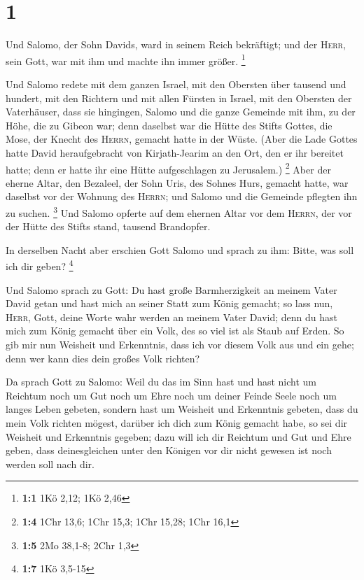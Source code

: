 \hypertarget{section}{%
\section{1}\label{section}}

 Und Salomo, der Sohn Davids, ward in seinem Reich
bekräftigt; und der \textsc{Herr}, sein Gott, war mit ihm und machte ihn
immer größer. \footnote{\textbf{1:1} 1Kö 2,12; 1Kö 2,46}

 Und Salomo redete mit dem ganzen Israel, mit den Obersten
über tausend und hundert, mit den Richtern und mit allen Fürsten in
Israel, mit den Obersten der Vaterhäuser,  dass sie
hingingen, Salomo und die ganze Gemeinde mit ihm, zu der Höhe, die zu
Gibeon war; denn daselbst war die Hütte des Stifts Gottes, die Mose, der
Knecht des \textsc{Herrn}, gemacht hatte in der Wüste. 
(Aber die Lade Gottes hatte David heraufgebracht von Kirjath-Jearim an
den Ort, den er ihr bereitet hatte; denn er hatte ihr eine Hütte
aufgeschlagen zu Jerusalem.) \footnote{\textbf{1:4} 1Chr 13,6; 1Chr
  15,3; 1Chr 15,28; 1Chr 16,1}  Aber der eherne Altar, den
Bezaleel, der Sohn Uris, des Sohnes Hurs, gemacht hatte, war daselbst
vor der Wohnung des \textsc{Herrn}; und Salomo und die Gemeinde pflegten
ihn zu suchen. \footnote{\textbf{1:5} 2Mo 38,1-8; 2Chr 1,3}
 Und Salomo opferte auf dem ehernen Altar vor dem
\textsc{Herrn}, der vor der Hütte des Stifts stand, tausend Brandopfer.

 In derselben Nacht aber erschien Gott Salomo und sprach
zu ihm: Bitte, was soll ich dir geben? \footnote{\textbf{1:7} 1Kö 3,5-15}

 Und Salomo sprach zu Gott: Du hast große Barmherzigkeit
an meinem Vater David getan und hast mich an seiner Statt zum König
gemacht;  so lass nun, \textsc{Herr}, Gott, deine Worte
wahr werden an meinem Vater David; denn du hast mich zum König gemacht
über ein Volk, des so viel ist als Staub auf Erden.  So
gib mir nun Weisheit und Erkenntnis, dass ich vor diesem Volk aus und
ein gehe; denn wer kann dies dein großes Volk richten?

 Da sprach Gott zu Salomo: Weil du das im Sinn hast und
hast nicht um Reichtum noch um Gut noch um Ehre noch um deiner Feinde
Seele noch um langes Leben gebeten, sondern hast um Weisheit und
Erkenntnis gebeten, dass du mein Volk richten mögest, darüber ich dich
zum König gemacht habe,  so sei dir Weisheit und
Erkenntnis gegeben; dazu will ich dir Reichtum und Gut und Ehre geben,
dass deinesgleichen unter den Königen vor dir nicht gewesen ist noch
werden soll nach dir.

